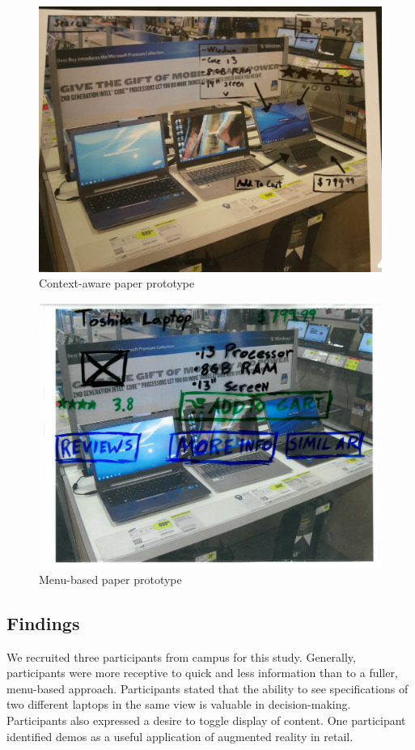 \begin{figure}
	\includegraphics[width=0.9\columnwidth]{figures/LowFiContext}
	\caption{Context-aware paper prototype}
	\label{fig:LowFiContext}
\end{figure}
\begin{figure}
	\includegraphics[width=0.9\columnwidth]{figures/LowFiMenu}
	\caption{Menu-based paper prototype}
	\label{fig:LowFiMenu}
\end{figure}

\subsection{Findings}
We recruited three participants from campus for this study. Generally, participants were more receptive to quick and less information than to a fuller, menu-based approach. Participants stated that the ability to see specifications of two different laptops in the same view is valuable in decision-making. Participants also expressed a desire to toggle display of content. One participant identified demos as a useful application of augmented reality in retail.